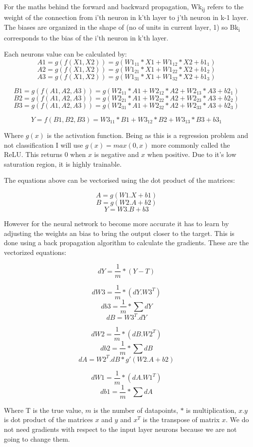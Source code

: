 \documentclass[11pt]{article}
\begin{document}
	For the maths behind the forward and backward propagation, Wk\textsubscript{ij} refers to the weight of the connection from i’th neuron in k'th layer to j’th neuron in k-1 layer. The biases are organized in the shape of (no of units in current layer, 1) so Bk\textsubscript{i} corresponds to the bias of the i’th neuron in k'th layer. 
	
	Each neurons value can be calculated by:
	\[A1 = g(f(X1,X2)) = g(W1_{11}*X1 + W1_{12}*X2 + b1_{1})\]
	\[A2 = g(f(X1,X2)) = g(W1_{21}*X1 + W1_{22}*X2 + b1_{2})\]
	\[A3 = g(f(X1,X2)) = g(W1_{31}*X1 + W1_{32}*X2 + b1_{3})\]
	
	\[B1 = g(f(A1,A2,A3)) = g(W2_{11}*A1 + W2_{12}*A2 + W2_{13}*A3 + b2_{1})\]
	\[B2 = g(f(A1,A2,A3)) = g(W2_{21}*A1 + W2_{22}*A2 + W2_{23}*A3 + b2_{2})\]
	\[B3 = g(f(A1,A2,A3)) = g(W2_{31}*A1 + W2_{32}*A2 + W2_{33}*A3 + b2_{3})\]
	
	\[Y = f(B1,B2,B3) = W3_{11}*B1 + W3_{12}*B2 + W3_{13}*B3 + b3_{1}\]
	
	Where $g(x)$ is the activation function. Being as this is a regression problem and not classification I will use $g(x) = max(0,x)$ more commonly called the ReLU. This returns 0 when $x$ is negative and $x$ when positive. Due to it’s low saturation region, it is highly trainable. 
	
	The equations above can be vectorised using the dot product of the matrices:
	
	\[A = g(W1.X + b1)\]
	\[B = g(W2.A + b2)\]
	\[Y = W3.B + b3\]
	
	However for the neural network to become more accurate it has to learn by adjusting the weights an bias to bring the output closer to the target. This is done using a back propagation algorithm to calculate the gradients. These are the vectorized equations:
	
	\[dY = \frac{1}{m} * (Y-T) \]
	
	\[dW3 = \frac{1}{m} * (dY.W3^T) \]
	\[db3 = \frac{1}{m} * \sum dY \]
	\[dB = W3^T.dY\]
	
	\[dW2 = \frac{1}{m} * (dB.W2^T) \]
	\[db2 = \frac{1}{m} * \sum dB \]
	\[dA = W2^T.dB * g'(W2.A+b2)\]
	
	\[dW1 = \frac{1}{m} * (dA.W1^T) \]
	\[db1 = \frac{1}{m} * \sum dA \]
	
	Where T is the true value, $m$ is the number of datapoints, $*$ is multiplication, $x.y$ is dot product of the matrices $x$ and $y$ and $x^T$ is the transpose of matrix $x$. We do not need gradients with respect to the input layer neurons because we are not going to change them.
\end{document}
